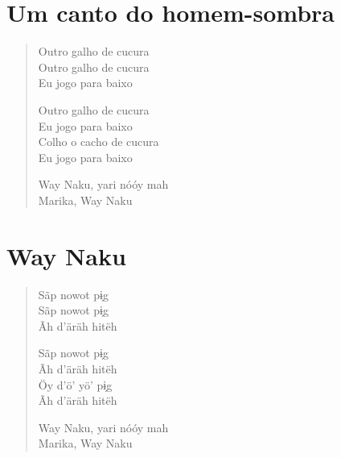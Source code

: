 \chapter{Um canto do homem-sombra}

\begin{verse}
Outro galho de cucura\\
Outro galho de cucura\\
Eu jogo para baixo

Outro galho de cucura\\
Eu jogo para baixo\\
Colho o cacho de cucura\\
Eu jogo para baixo

Way Naku, yari nóóy mah\\
Marika, Way Naku
\end{verse}

\chapter{Way Naku}

\begin{verse}
Sãp nowot pɨ̗g\\
Sãp nowot pɨ̗g\\
Ãh d’äräh hitëh

Sãp nowot pɨ̗g\\
Ãh d’äräh hitëh\\
Öy d’ö’ yö’ pɨ̗g\\
Ãh d’äräh hitëh

Way Naku, yari nóóy mah\\
Marika, Way Naku
\end{verse}









